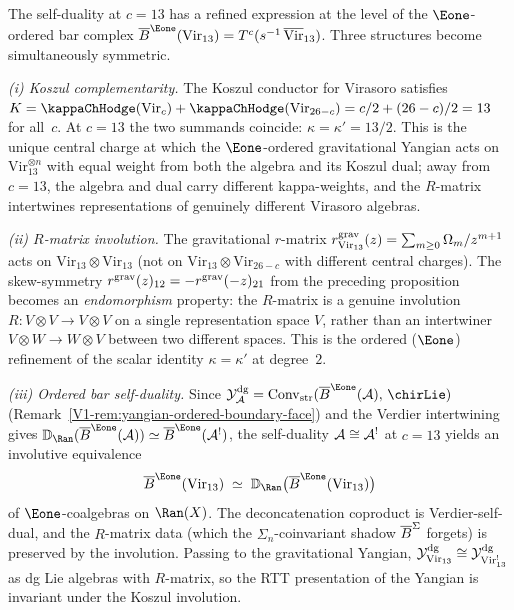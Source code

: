 \begin{remark}
\label{rem:yangian-vir13-self-dual}
\ClaimStatusProvedHere
{}
%
%
The self-duality at $c = 13$ has a refined expression at the level
of the $\Eone$-ordered bar complex
$\barB^{\Eone}(\mathrm{Vir}_{13})
= T^c(s^{-1}\,\overline{\mathrm{Vir}}_{13})$.
Three structures become simultaneously symmetric.

\emph{(i) Koszul complementarity.}\;
The Koszul conductor for Virasoro satisfies
$K = \kappaChHodge(\mathrm{Vir}_c) + \kappaChHodge(\mathrm{Vir}_{26-c})
= c/2 + (26-c)/2 = 13$
for all~$c$.
At $c = 13$ the two summands coincide:
$\kappa = \kappa' = 13/2$.
This is the unique central charge at which the
$\Eone$-ordered gravitational Yangian acts on
$\mathrm{Vir}_{13}^{\otimes n}$ with equal weight from both the
algebra and its Koszul dual; away from $c = 13$,
the algebra and dual carry different kappa-weights, and the
$R$-matrix intertwines representations of genuinely different
Virasoro algebras.

\emph{(ii) $R$-matrix involution.}\;
The gravitational $r$-matrix $r^{\mathrm{grav}}_{\mathrm{Vir}_{13}}(z)
= \sum_{m \geq 0} \Omega_m / z^{m+1}$
acts on $\mathrm{Vir}_{13} \otimes \mathrm{Vir}_{13}$
(not on $\mathrm{Vir}_{13} \otimes \mathrm{Vir}_{26-c}$
with different central charges).
The skew-symmetry
$r^{\mathrm{grav}}(z)_{12} = -r^{\mathrm{grav}}(-z)_{21}$
from the preceding proposition becomes an \emph{endomorphism}
property: the $R$-matrix is a genuine involution
$R \colon V \otimes V \to V \otimes V$
on a single representation space $V$, rather than an intertwiner
$V \otimes W \to W \otimes V$ between two different spaces.
This is the ordered ($\Eone$) refinement of the scalar identity
$\kappa = \kappa'$ at degree~$2$.

\emph{(iii) Ordered bar self-duality.}\;
Since $\Ydg_\cA
= \Convstr(\barB^{\Eone}(\cA),\,\chirLie)$
(Remark~\ref{V1-rem:yangian-ordered-boundary-face})
and the Verdier intertwining gives
$\mathbb{D}_{\Ran}(\barB^{\Eone}(\cA))
\simeq \barB^{\Eone}(\cA^!)$,
the self-duality $\mathcal{A} \cong \mathcal{A}^!$ at $c = 13$
yields an involutive equivalence
\begin{equation}\label{eq:thqg-V-ordered-bar-self-dual}
\barB^{\Eone}(\mathrm{Vir}_{13})
\;\simeq\;
\mathbb{D}_{\Ran}\bigl(\barB^{\Eone}(\mathrm{Vir}_{13})\bigr)
\end{equation}
of $\Eone$-coalgebras on $\Ran(X)$.
The deconcatenation coproduct is Verdier-self-dual, and the
$R$-matrix data (which the $\Sigma_n$-coinvariant shadow
$\overline{B}^{\Sigma}$ forgets) is preserved by the involution.
Passing to the gravitational Yangian,
$\mathcal{Y}^{\mathrm{dg}}_{\mathrm{Vir}_{13}} \cong
\mathcal{Y}^{\mathrm{dg}}_{\mathrm{Vir}_{13}^!}$
as dg Lie algebras with $R$-matrix, so the RTT presentation
of the Yangian is invariant under the Koszul involution.


\end{remark}
